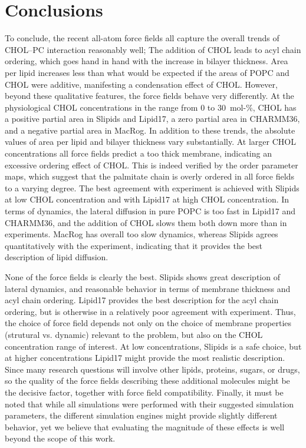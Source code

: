 \documentclass[aps,prl,superscriptaddress]{revtex4-2}
\begin{document}
\section{Conclusions}

To conclude, the recent all-atom force fields all capture the overall trends of CHOL--PC interaction reasonably well; The addition of CHOL leads to acyl chain ordering, which goes hand in hand with the increase in bilayer thickness. Area per lipid increases less than what would be expected if the areas of POPC and CHOL were additive, manifesting a condensation effect of CHOL. However, beyond these qualitative features, the force fields behave very differently. At the physiological CHOL concentrations in the range from 0 to 30~mol-\%, CHOL has a positive partial area in Slipids and Lipid17, a zero partial area in CHARMM36, and a negative partial area in MacRog. In addition to these trends, the absolute values of area per lipid and bilayer thickness vary substantially. At larger CHOL concentrations all force fields predict a too thick membrane, indicating an excessive ordering effect of CHOL. This is indeed verified by the order parameter maps, which suggest that the palmitate chain is overly ordered in all force fields to a varying degree. The best agreement with experiment is achieved with Slipids at low CHOL concentration and with Lipid17 at high CHOL concentration. In terms of dynamics, the lateral diffusion in pure POPC is too fast in Lipid17 and CHARMM36, and the addition of CHOL slows them both down more than in experiments. MacRog has overall too slow dynamics, whereas Slipids agrees quantitatively with the experiment, indicating that it provides the best description of lipid diffusion.

None of the force fields is clearly the best. Slipids shows great description of lateral dynamics, and reasonable behavior in terms of membrane thickness and acyl chain ordering. Lipid17 provides the best description for the acyl chain ordering, but is otherwise in a relatively poor agreement with experiment. Thus, the choice of force field depends not only on the choice of membrane properties (strutural vs. dynamic) relevant to the problem, but also on the CHOL concentration range of interest. At low  concentrations, Slipids is a safe choice, but at higher concentrations Lipid17 might provide the most realistic description. Since many research questions will involve other lipids, proteins, sugars, or drugs, so the quality of the force fields describing these additional molecules might be the decisive factor, together with force field compatibility. Finally, it must be noted that while all simulations were performed with their suggested simulation parameters, the different simulation engines might provide slightly different behavior, yet we believe that evaluating the magnitude of these effects is well beyond the scope of this work.
\end{document}
